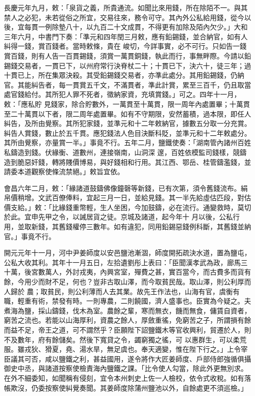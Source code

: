\begin{pinyinscope}
 長慶元年九月，敕：「泉貨之義，所貴通流。如聞比來用錢，所在除陌不一。與其禁人之必犯，未若從俗之所宜，交易往來，務令可守。其內外公私給用錢，從今以後，宜每貫一例除墊八十，以九百二十文成貫，不得更有加除及陌內欠少。」大和三年六月，中書門下奏：「準元和四年閏三月敕，應有鉛錫錢，並合納官，如有人糾得一錢，賞百錢者。當時敕條，貴在
 峻切，今詳事實，必不可行。只如告一錢賞百錢，則有人告一百貫錫錢，須賞一萬貫銅錢，執此而行，事無畔際。今請以鉛錫錢交易者，一貫已下，以州府常行決脊杖二十；十貫已下，決六十，徒三年；過十貫已上，所在集眾決殺。其受鉛錫錢交易者，亦準此處分。其用鉛錫錢，仍納官。其能糾告者，每一貫賞五千文，不滿貫者，準此計賞，累至三百千，仍且取當處官錢給付。其所犯人罪不死者，徵納家資，充填賞錢。」可之。四年十一月，敕：「應私貯
 見錢家，除合貯數外，一萬貫至十萬貫，限一周年內處置畢；十萬貫至二十萬貫以下者，限二周年處置畢。如有不守期限，安然蓄積，過本限，即任人糾告，及所由覺察。其所犯家錢，並準元和十二年敕納官，據數五分取一分充賞。糾告人賞錢，數止於五千貫。應犯錢法人色目決斷科貶，並準元和十二年敕處分。其所由覺察，亦量賞一半。」事竟不行。五年二月，鹽鐵使奏：「湖南管內諸州百姓私鑄造到錢。伏緣衡、道數州，連接嶺南，山洞深
 邃，百姓依模監司錢樣，競鑄造到脆惡奸錢，轉將賤價博易，與好錢相和行用。其江西、鄂岳、桂管鑄濫錢，並請委本道觀察使條流禁絕。」敕旨宜依。



 會昌六年二月，敕：「緣諸道鼓鑄佛像鐘磬等新錢，已有次第，須令舊錢流布。絹帛價稍增。文武百僚俸料，宜起三月一日，並給見錢。其一半先給虛估匹段，對估價支給。」敕：「比緣錢重幣輕，生人坐困，今加鼓鑄，必在流行。通變救時，莫切於此。宜申先甲之令，以誡居貨之徒。京城及諸道，起今年十
 月以後，公私行用，並取新錢，其舊錢權停三數年。如有違犯，同用鉛錫惡錢例科斷，其舊錢並納官。」事竟不行。



 開元元年十一月，河中尹姜師度以安邑鹽池漸涸，師度開拓疏決水道，置為鹽屯，公私大收其利。其年十一月五日，左拾遺劉彤上表曰：「臣聞漢孝武為政，廊馬三十萬，後宮數萬人，外討戎夷，內興宮室，殫費之甚，實百當今，而古費多而貨有餘，今用少而財不足，何也？豈非古取山澤，而今取貧民哉。取山澤，則公利厚而人歸於
 農；取貧民，則公利薄而人去其業。故先王作法也，山海有官，虞衡有職，輕重有術，禁發有時。一則專農，二則饒國，濟人盛事也。臣實為今疑之。夫煮海為鹽，採山鑄錢，伐木為室。農餘之輩，寒而無衣，饑而無食，傭賃自資者，窮苦之流也。若能以山海厚利，資農之餘人，厚斂重徭，免窮苦之子，所謂損有餘而益不足，帝王之道，可不謂然乎？臣願陛下詔鹽鐵木等官收興利，貿遷於人，則不及數年，府有餘儲矣。然後下寬貸之令，蠲窮獨之徭，可
 以惠群生，可以柔荒服。雖戎狄、猾夏，堯、湯水旱，無足虞也。奉天適變，惟在陛下行之。」上令宰臣議其可否，咸以鹽鐵之利，甚益國用，遂令將作大匠姜師度、戶部侍郎強循俱攝御史中丞，與諸道按察使檢責海內鹽鐵之課。「比令使人勾當，除此外更無別求。在外不細委知，如聞稱有侵刻，宜令本州刺史上佐一人檢校，依令式收稅。如有落帳欺沒，仍委按察使糾覺奏聞。其姜師度除蒲州鹽池以外，自餘處更不須巡檢。」




\end{pinyinscope}
